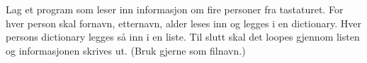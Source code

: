 %
%
Lag et program som leser inn informasjon om fire personer fra tastaturet. For hver person skal fornavn, etternavn, alder leses inn og legges i en dictionary. Hver persons dictionary legges så inn i en liste. Til slutt skal det loopes gjennom listen og informasjonen skrives ut. (Bruk gjerne  som filnavn.)
